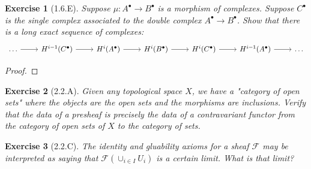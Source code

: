 \documentclass{amsart}
\newtheorem*{exercise*}{Exercise}
\begin{document}
\vspace{0.1in}


\begin{exercise*}[1.6.E]
    Suppose $\mu:A^\bullet\rightarrow B^\bullet$ is a morphism of complexes. Suppose $C^\bullet$ is the single complex associated to the double complex $A^\bullet\rightarrow B^\bullet$. Show that there is a long exact sequence of complexes:
    \begin{equation*}
        \begin{tikzcd}
            \ldots \arrow[r] & H^{i-1}(C^\bullet) \arrow[r] & H^i(A^\bullet) \arrow[r] & H^i(B^\bullet) \arrow[r] & H^i(C^\bullet) \arrow[r] & H^{i-1}(A^\bullet) \arrow[r] & \ldots
        \end{tikzcd}
    \end{equation*}
\end{exercise*}

\vspace{0.1in}

\begin{proof}
	
\end{proof}

\vspace{0.1in}



\begin{exercise*}[2.2.A]
    Given any topological space $X$, we have a "category of open sets" where the objects
    are the open sets and the morphisms are inclusions. Verify that the data of a presheaf is
    precisely the data of a contravariant functor from the category of open sets of $X$ to
    the category of sets.
\end{exercise*}

\vspace{0.1in}


\begin{exercise*}[2.2.C]
    The identity and gluability axioms for a sheaf $\mathcal{F}$ may be interpreted
    as saying that $\mathcal{F}(\cup_{i \in I}U_i)$ is a certain limit. What is that limit?
\end{exercise*}

\vspace{0.1in}
\end{document}
